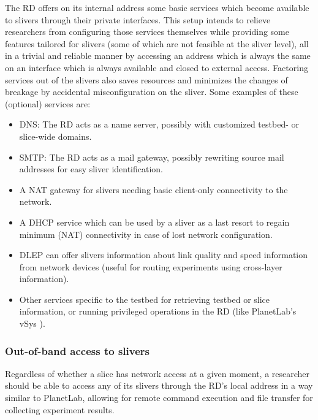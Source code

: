 \documentclass[conference]{IEEEtran}
\begin{document}
The RD offers on its internal address some basic services which become
available to slivers through their private interfaces.  This setup intends to
relieve researchers from configuring those services themselves while providing
some features tailored for slivers (some of which are not feasible at
the sliver level), all in a trivial and reliable manner by accessing an
address which is always the same on an interface which is always available and
closed to external access.  Factoring services out of the slivers also saves
resources and minimizes the changes of breakage by accidental misconfiguration
on the sliver.  Some examples of these (optional) services are:

\begin{itemize}
\item DNS: The RD acts as a name server, possibly with customized testbed- or
  slice-wide domains.
\item SMTP: The RD acts as a mail gateway, possibly rewriting source mail
  addresses for easy sliver identification.
\item A NAT gateway for slivers needing basic client-only connectivity to the
  network.
\item A DHCP service which can be used by a sliver as a last resort to regain
  minimum (NAT) connectivity in case of lost network configuration.
\item DLEP \cite{dlep} can offer slivers information about link quality and
  speed information from network devices (useful for routing experiments using
  cross-layer information).
\item Other services specific to the testbed for retrieving testbed or slice
  information, or running privileged operations in the RD (like PlanetLab's
  vSys \cite{vsys}).
\end{itemize}


\subsubsection{Out-of-band access to slivers}

Regardless of whether a slice has network access at a given moment, a
researcher should be able to access any of its slivers through the RD's local address in a
way similar to PlanetLab, allowing for remote
command execution and file transfer for collecting experiment results.
\end{document}

